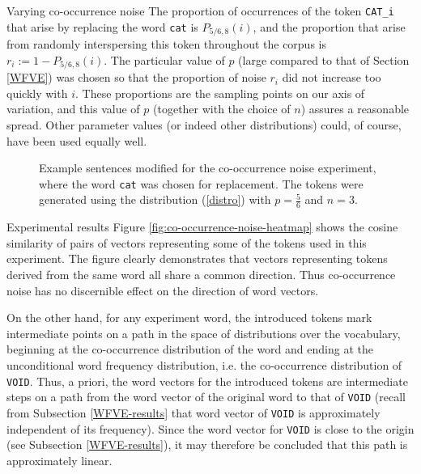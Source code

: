 \documentclass{article} %
\newcommand{\word}[1]{\texttt{#1}}
\begin{document}
\begin{section}{Varying co-occurrence noise}
The proportion of occurrences of the token \word{CAT\_i} that arise by
replacing the word \word{cat} is $P_{5/6, 8}(i)$, and the proportion
that arise from randomly interspersing this token throughout the corpus
is $r_i := 1 - P_{5/6, 8}(i)$.  The particular value of $p$ (large
compared to that of Section \ref{WFVE}) was chosen so that the
proportion of noise $r_i$ did not increase too quickly with $i$.  These
proportions are the sampling points on our axis of variation, and this
value of $p$ (together with the choice of $n$) assures a reasonable
spread.  Other parameter values (or indeed other distributions) could,
of course, have been used equally well.

\begin{table}
	
	\label{fig:co-occurrence-noise-counts}
	\caption{Words chosen for the co-occurrence noise experiment, along with the occurrence counts in the unmodified corpus. }
	\label{cooccurrence-noise-words}
\end{table}

\begin{figure}
	\begin{mdframed}
	
	\end{mdframed}
	\caption{Example sentences modified for the co-occurrence noise
          experiment, where the word \word{cat} was chosen for
          replacement.  The tokens were generated using the distribution
          (\ref{distro}) with $p = \tfrac{5}{6}$ and $n=3$.}
	\label{fig:co-occurrence-noise-experiment-text}
\end{figure}

\begin{subsection}{Experimental results}
Figure \ref{fig:co-occurrence-noise-heatmap} shows the cosine similarity
of pairs of vectors representing some of the tokens used in this
experiment.  The figure clearly demonstrates that vectors representing
tokens derived from the same word all share a common direction.  Thus
co-occurrence noise has no discernible effect on the direction of word vectors.

On the other hand, for any experiment word, the introduced tokens mark
intermediate points on a path in the space of distributions over the
vocabulary, beginning at the co-occurrence distribution of the word and ending
at the unconditional word frequency distribution, i.e. the co-occurrence
distribution of \word{VOID}.
Thus, a priori, the word vectors for the introduced tokens are intermediate
steps on a path from the word vector of the original word to that of
\word{VOID} (recall from Subsection \ref{WFVE-results} that word vector of
\word{VOID} is approximately independent of its frequency).
Since the word vector for \word{VOID} is close to the origin (see Subsection \ref{WFVE-results}), it may therefore be concluded that this path is approximately linear.


\end{subsection}
\end{section}
\end{document}
